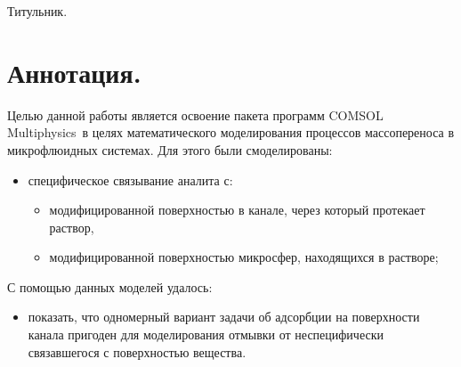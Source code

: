 \documentclass[oneside,final,12pt]{extreport}
\begin{document}
\begin{titlepage}

Титульник.

\end{titlepage}
\setcounter{page}{2}

\section*{Аннотация.}
Целью данной работы является освоение пакета программ
COMSOL Multiphysics\texttrademark\ в целях
математического моделирования процессов массопереноса в микрофлюидных системах.
Для этого были смоделированы:
\begin{itemize}
  \item специфическое связывание аналита с:
    \begin{itemize}
      \item модифицированной поверхностью в канале, через который протекает раствор,
      \item модифицированной поверхностью микросфер, находящихся в растворе;

    \end{itemize}


\end{itemize}

С помощью данных моделей удалось:
\begin{itemize}
  \item показать, что одномерный вариант задачи об адсорбции на поверхности канала
    пригоден для моделирования отмывки от неспецифически связавшегося с поверхностью вещества.

\end{itemize}



\tableofcontents
\end{document}
